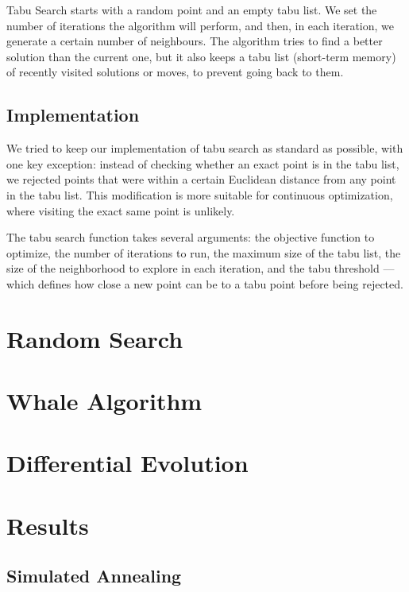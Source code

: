 \documentclass{report}
\begin{document}
Tabu Search starts with a random point and an empty tabu list. We set the number of iterations the algorithm will perform, and then, in each iteration, we generate a certain number of neighbours. The algorithm tries to find a better solution than the current one, but it also keeps a tabu list (short-term memory) of recently visited solutions or moves, to prevent going back to them.

\subsection*{Implementation}

We tried to keep our implementation of tabu search as standard as possible, with one key exception: instead of checking whether an exact point is in the tabu list, we rejected points that were within a certain Euclidean distance from any point in the tabu list. This modification is more suitable for continuous optimization, where visiting the exact same point is unlikely.

The tabu search function takes several arguments: the objective function to optimize, the number of iterations to run, the maximum size of the tabu list, the size of the neighborhood to explore in each iteration, and the tabu threshold — which defines how close a new point can be to a tabu point before being rejected.

\section*{Random Search}

\section*{Whale Algorithm}

\section*{Differential Evolution}

\section*{Results}

\subsection*{Simulated Annealing}
\end{document}
